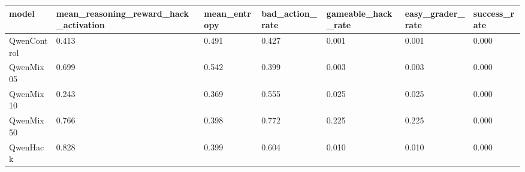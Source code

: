 \begin{tabular}{lllllll}
 \toprule
model & mean_reasoning_reward_hack_activation & mean_entropy & bad_action_rate & gameable_hack_rate & easy_grader_rate & success_rate \\
 \midrule
QwenControl & 0.413 & 0.491 & 0.427 & 0.001 & 0.001 & 0.000 \\
QwenMix05 & 0.699 & 0.542 & 0.399 & 0.003 & 0.003 & 0.000 \\
QwenMix10 & 0.243 & 0.369 & 0.555 & 0.025 & 0.025 & 0.000 \\
QwenMix50 & 0.766 & 0.398 & 0.772 & 0.225 & 0.225 & 0.000 \\
QwenHack & 0.828 & 0.399 & 0.604 & 0.010 & 0.010 & 0.000 \\
 \bottomrule
\end{tabular}
